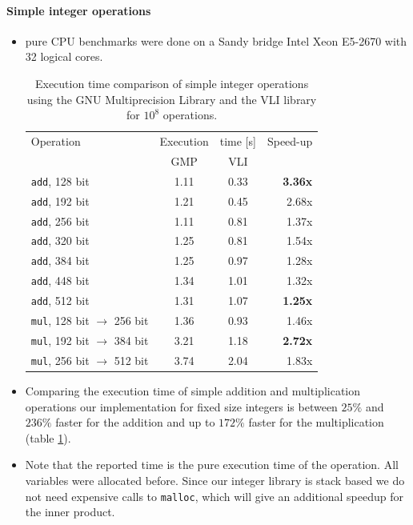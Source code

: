 \documentclass[oribibl,a4paper]{llncs2e/llncs}
\begin{document}
\paragraph{Simple integer operations}
\begin{itemize}
\item pure CPU benchmarks were done on a Sandy bridge Intel Xeon E5-2670 with 32 logical cores.
\begin{table}
    \centering
    \begin{tabular}{l|cc|r}
     Operation & Execution & time [s] & Speed-up\\
       & GMP & VLI & \\
     \hline
    \verb|add|, 128 bit & 1.11 & 0.33 & {\bf 3.36x} \\
    \verb|add|, 192 bit & 1.21 & 0.45 & 2.68x \\
    \verb|add|, 256 bit & 1.11 & 0.81 & 1.37x \\
    \verb|add|, 320 bit & 1.25 & 0.81 & 1.54x \\
    \verb|add|, 384 bit & 1.25 & 0.97 & 1.28x \\
    \verb|add|, 448 bit & 1.34 & 1.01 & 1.32x \\
    \verb|add|, 512 bit & 1.31 & 1.07 & {\bf 1.25x} \\
    \hline
    \verb|mul|, 128 bit $\rightarrow$ 256 bit & 1.36 & 0.93 & 1.46x \\
    \verb|mul|, 192 bit $\rightarrow$ 384 bit & 3.21 & 1.18 & {\bf 2.72x} \\
    \verb|mul|, 256 bit $\rightarrow$ 512 bit & 3.74 & 2.04 & 1.83x \\ 
    \end{tabular}
    \caption{Execution time comparison of simple integer operations using the GNU Multiprecision Library and the VLI library for $10^8$ operations.}
    \label{tab:vli_vs_gmp}
\end{table}
\item Comparing the execution time of simple addition and multiplication operations our implementation for fixed size integers is between $25\%$ and $236\%$ faster for the addition and up to $172\%$ faster for the multiplication (table \ref{tab:vli_vs_gmp}).
\item Note that the reported time is the pure execution time of the operation. All variables were allocated before.
Since our integer library is stack based we do not need expensive calls to \verb|malloc|, which will give an additional speedup for the inner product.
\end{itemize}
\end{document}
